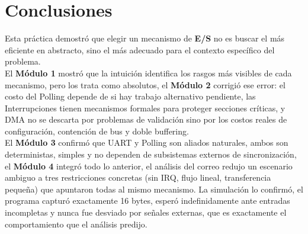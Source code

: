 \documentclass[12pt,letterpaper]{article}
\begin{document}
\newpage

\section*{Conclusiones}

Esta práctica demostró que elegir un mecanismo de \textbf{E/S} no es buscar el más eficiente en abstracto,
sino el más adecuado para el contexto específico del problema.\\

El \textbf{Módulo 1} mostró que la intuición identifica los rasgos más visibles de cada mecanismo, pero los
trata como absolutos, el \textbf{Módulo 2} corrigió ese error: el costo del Polling depende de si hay trabajo
alternativo pendiente, las Interrupciones tienen mecanismos formales para proteger secciones críticas, y DMA no
se descarta por problemas de validación sino por los costos reales de configuración, contención de bus y
doble buffering.\\

El \textbf{Módulo 3} confirmó que UART y Polling son aliados naturales, ambos son deterministas, simples y no
dependen de subsistemas externos de sincronización, el \textbf{Módulo 4} integró todo lo anterior, el análisis
del correo redujo un escenario ambiguo a tres restricciones concretas (sin IRQ, flujo lineal, transferencia
pequeña) que apuntaron todas al mismo mecanismo. La simulación lo confirmó, el programa capturó exactamente 16
bytes, esperó indefinidamente ante entradas incompletas y nunca fue desviado por señales externas, que es
exactamente el comportamiento que el análisis predijo.
\end{document}
